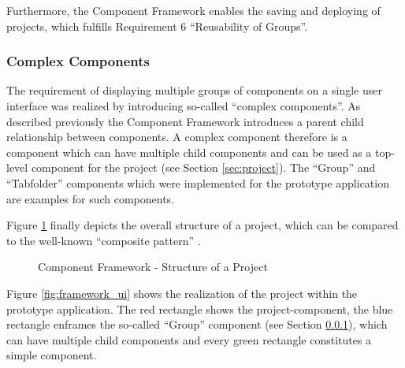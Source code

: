 Furthermore, the Component Framework enables the saving and deploying of projects, which fulfills
Requirement 6 ``Reusability of Groups''.

\subsubsection{Complex Components}
\label{sec:complex_components}
The requirement of displaying multiple groups of components on a single user interface was realized
by introducing so-called ``complex components''. As described previously the Component Framework
introduces a parent child relationship between components. A complex component therefore is a
component which can have multiple child components and can be used as a top-level component for the
project (see Section \ref{sec:project}). The ``Group'' and ``Tabfolder'' components which were
implemented for the prototype application are examples for such components.

Figure \ref{fig:project_structure} finally depicts the overall structure of a project, which can be
compared to the well-known ``composite pattern'' \cite{GammaHelmEtAl95}.

\begin{figure}
	\centering
	\caption{Component Framework - Structure of a Project}
	\label{fig:project_structure}
\end{figure}

Figure \ref{fig:framework_ui} shows the realization of the project within the prototype
application. The red rectangle shows the project-component, the blue rectangle enframes the
so-called ``Group'' component (see Section \ref{sec:complex_components}), which can have multiple
child components and every green rectangle constitutes a simple component.

